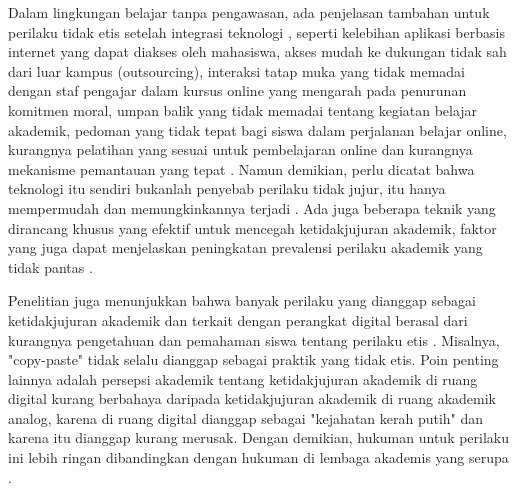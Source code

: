 Dalam lingkungan belajar tanpa pengawasan, ada penjelasan tambahan untuk perilaku tidak etis setelah integrasi teknologi \citep{peytcheva2018impact}, seperti kelebihan aplikasi berbasis internet yang dapat diakses oleh mahasiswa, akses mudah ke dukungan tidak sah dari luar kampus (outsourcing), interaksi tatap muka yang tidak memadai dengan staf pengajar dalam kursus online yang mengarah pada penurunan komitmen moral, umpan balik yang tidak memadai tentang kegiatan belajar akademik, pedoman yang tidak tepat bagi siswa dalam perjalanan belajar online, kurangnya pelatihan yang sesuai untuk pembelajaran online dan kurangnya mekanisme pemantauan yang tepat \citep{von2001can}. Namun demikian, perlu dicatat bahwa teknologi itu sendiri bukanlah penyebab perilaku tidak jujur, itu hanya mempermudah dan memungkinkannya terjadi \citep{blau2017ethical} \citep{etgar2019white} \citep{sarwar2018paid}. Ada juga beberapa teknik yang dirancang khusus yang efektif untuk mencegah ketidakjujuran akademik, faktor yang juga dapat menjelaskan peningkatan prevalensi perilaku akademik yang tidak pantas \citep{marshall2017attack}.

Penelitian juga menunjukkan bahwa banyak perilaku yang dianggap sebagai ketidakjujuran akademik dan terkait dengan perangkat digital berasal dari kurangnya pengetahuan dan pemahaman siswa tentang perilaku etis \citep{blau2017ethical}. Misalnya, "copy-paste" tidak selalu dianggap sebagai praktik yang tidak etis. Poin penting lainnya adalah persepsi akademik tentang ketidakjujuran akademik di ruang digital kurang berbahaya daripada ketidakjujuran akademik di ruang akademik analog, karena di ruang digital dianggap sebagai "kejahatan kerah putih" \citep{etgar2019white} dan karena itu dianggap kurang merusak. Dengan demikian, hukuman untuk perilaku ini lebih ringan dibandingkan dengan hukuman di lembaga akademis yang serupa \citep{etgar2019white}.